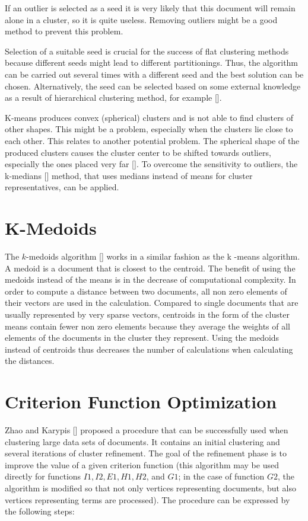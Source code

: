 If an outlier is selected as a seed it is very likely that this document will remain alone in a cluster, so it is quite useless. Removing outliers might be a good method to prevent this problem.

Selection of a suitable seed is crucial for the success of flat clustering methods because different seeds might lead to different partitionings. Thus, the algorithm can be carried out several times with a different seed and the best solution can be chosen. Alternatively, the seed can be selected based on some external knowledge as a result of hierarchical clustering method, for example [\cite{ref257}].

K-means produces convex (spherical) clusters and is not able to find clusters of other shapes. This might be a problem, especially when the clusters lie close to each other. This relates to another potential problem. The spherical shape of the produced clusters causes the cluster center to be shifted towards outliers, especially the ones placed very far [\cite{ref8}]. To overcome the sensitivity to outliers, the k-medians [\cite{ref5}] method, that uses medians instead of means for cluster representatives, can be applied.

\section{K-Medoids}
The $k$-medoids algorithm [\cite{ref7}] works in a similar fashion as the k -means algorithm. A medoid is a document that is closest to the centroid. The benefit of using the medoids instead of the means is in the decrease of computational complexity. In order to compute a distance between two documents, all non zero elements of their vectors are used in the calculation. Compared to single documents that are usually represented by very sparse vectors, centroids in the form of the cluster means contain fewer non zero elements because they average the weights of all elements of the documents in the cluster they represent. Using the medoids instead of centroids thus decreases the number of calculations when calculating the distances.

\section{Criterion Function Optimization}
Zhao and Karypis [\cite{ref294}] proposed a procedure that can be successfully used when clustering large data sets of documents. It contains an initial clustering and several iterations of cluster refinement. The goal of the refinement phase is to improve the value of a given criterion function (this algorithm may be used directly for functions $I 1, I 2, E 1, H 1, H 2$, and $G 1$; in the case of function $G 2$, the algorithm is modified so that not only vertices representing documents, but also vertices representing terms are processed). The procedure can be expressed by the following steps:

